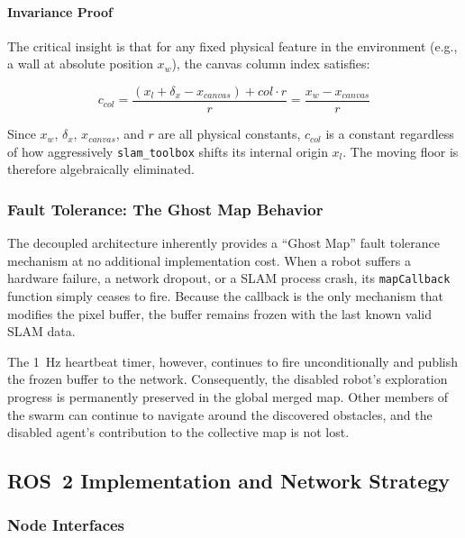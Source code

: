 \paragraph{Invariance Proof}
The critical insight is that for any fixed physical feature in the environment (e.g., a wall at absolute position $x_w$), the canvas column index satisfies:

\begin{equation}
    c_{col} = \frac{(x_l + \delta_x - x_{canvas}) + col \cdot r}{r} = \frac{x_w - x_{canvas}}{r}
    \label{eq:invariance}
\end{equation}

Since $x_w$, $\delta_x$, $x_{canvas}$, and $r$ are all physical constants, $c_{col}$ is a constant regardless of how aggressively \texttt{slam\_toolbox} shifts its internal origin $x_l$. The moving floor is therefore algebraically eliminated.

\subsubsection{Fault Tolerance: The Ghost Map Behavior}
\label{subsubsec:ghost_map}

The decoupled architecture inherently provides a ``Ghost Map'' fault tolerance mechanism at no additional implementation cost. When a robot suffers a hardware failure, a network dropout, or a SLAM process crash, its \texttt{mapCallback} function simply ceases to fire. Because the callback is the only mechanism that modifies the pixel buffer, the buffer remains frozen with the last known valid SLAM data.

The 1~Hz heartbeat timer, however, continues to fire unconditionally and publish the frozen buffer to the network. Consequently, the disabled robot's exploration progress is permanently preserved in the global merged map. Other members of the swarm can continue to navigate around the discovered obstacles, and the disabled agent's contribution to the collective map is not lost.

\subsection{ROS~2 Implementation and Network Strategy}
\label{subsec:map_merge_ros2}

\subsubsection{Node Interfaces}


